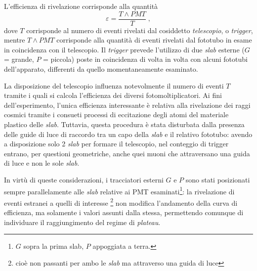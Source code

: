 \documentclass[10pt, oneside, a4paper]{article}   	%
\begin{document}
L'efficienza di rivelazione corrisponde alla quantità
\[\varepsilon = \frac{T\wedge PMT}{T}\;,\]
dove $T$ corrisponde al numero di eventi rivelati dal cosiddetto \textit{telescopio}, o \textit{trigger}, mentre $T\wedge PMT$ corrisponde alla quantità di eventi rivelati dal fototubo in esame in coincidenza con il telescopio. Il \emph{trigger} prevede l'utilizzo di due \emph{slab} esterne \linebreak ($G$ = grande, $P$ = piccola) poste in coincidenza di volta in volta con alcuni fototubi dell'apparato, differenti da quello momentaneamente esaminato. 

La disposizione del telescopio influenza notevolmente il numero di eventi $T$ tramite i quali si calcola l'efficienza dei diversi fotomoltiplicatori. Ai fini dell'esperimento, l'unica efficienza interessante è relativa alla rivelazione dei raggi cosmici tramite i consueti processi di eccitazione degli atomi del materiale plastico delle \emph{slab}. 
Tuttavia, questa procedura è stata disturbata dalla presenza delle guide di luce di raccordo tra un capo della \emph{slab} e il relativo fototubo: 
avendo a disposizione solo 2 \emph{slab} per formare il telescopio, nel conteggio di trigger entrano, per questioni geometriche, anche quei muoni che attraversano una guida di luce e non le sole \emph{slab}.

In virtù di queste considerazioni, i tracciatori esterni $G$ e $P$ sono stati posizionati sempre parallelamente alle \emph{slab} relative ai PMT esaminati\footnote{$G$ sopra la prima slab, $P$ appoggiata a terra.}: la rivelazione di eventi estranei  
a quelli di interesse \footnote{cioè non passanti per ambo le \emph{slab} ma attraverso una guida di luce} 
non modifica l'andamento della curva di efficienza, ma solamente i valori assunti dalla stessa, permettendo comunque di individuare il raggiungimento del regime di \emph{plateau}.
\end{document}
